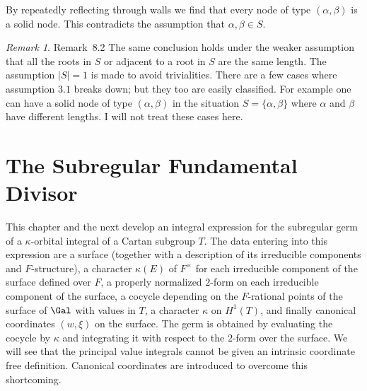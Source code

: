 \documentclass{memo-l}
\theoremstyle{definition}
\theoremstyle{remark}
\newtheorem{remark}[theorem]{Remark}
\numberwithin{section}{chapter}
\numberwithin{equation}{chapter}
\begin{document}
\medskip
\medskip

\noindent
By repeatedly reflecting through walls we find that every node of type
$({\alpha},{\beta})$ is a solid node.  This contradicts the assumption that
${\alpha},{\beta}  \in  S$.

{\medskip}


\begin{remark}{Remark\ 8.2}  The same conclusion holds under the weaker
assumption that all the roots in $S$ or adjacent to a root in $S$ are the
same length.  The assumption $\vert S\vert = 1$ is made to avoid
trivialities.  There are a few cases where assumption $3.1$ breaks down;
but they too are easily classified.  For example one can have a solid node
of type $({\alpha},{\beta})$ in the situation $S = \{{\alpha},{\beta}\}$
where ${\alpha}$ and ${\beta}$ have different lengths.  I will not treat
these cases here.
\end{remark}




\chapter{The Subregular Fundamental Divisor}





   This chapter and the next develop an integral expression for the
subregular germ of a ${\kappa}$-orbital integral of a Cartan subgroup $T$.
The data entering into this expression are a surface (together with a
description of its irreducible components and $F$-structure), a character
${\kappa}(E)$ of $F^{\times}$ for each irreducible component of the surface
defined over $F$, a properly normalized $2$-form on each irreducible
component of the surface, a cocycle depending on the $F$-rational points of
the surface of $\Gal$ with values in $T$, a character ${\kappa}$
on $H^{1}(T)$, and finally canonical coordinates $(w,{\xi})$ on the
surface.  The germ is obtained by evaluating the cocycle by ${\kappa}$ and
integrating it with respect to the $2$-form over the surface.  We will see
that the principal value integrals cannot be given an intrinsic coordinate
free definition.  Canonical coordinates are introduced to overcome this
shortcoming.
\end{document}
